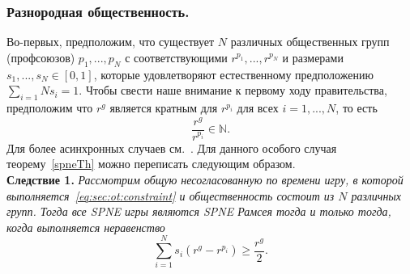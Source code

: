 \subsubsection{Разнородная общественность.} Во-первых, предположим, что существует $N$ различных общественных групп (профсоюзов) $p_1,...,p_N$ с соответствующими $r^{p_1},...,r^{p_N}$ и размерами $s_1,...,s_N \in [0,1]$, которые удовлетворяют естественному предположению $\sum_{i=1}{N}s_i = 1$. Чтобы свести наше внимание к первому ходу правительства, предположим что $r^g$ является кратным для $r^{p_i}$ для всех $i = 1,...,N$, то есть
$$ \frac{r^g}{r^{p_i}} \in \mathbb{N}.$$
Для более асинхронных случаев  см.~\cite{libichIncorpo}. Для данного особого случая теорему~\ref{spneTh} можно переписать следующим образом.\\
\textbf{Следствие 1.} \textit{Рассмотрим общую несогласованную по времени игру, в которой выполняется~\eqref{eq:sec:ot:constraint} и общественность состоит из $N$ различных групп. Тогда все SPNE игры являются SPNE Рамсея тогда и только тогда, когда выполняется неравенство
	\begin{equation}
	\label{sec:hetero:main4}
	\sum_{i=1}^N s_i(r^g - r^{p_i}) \geqslant \frac{r^g}{2} .
	\end{equation}
}

